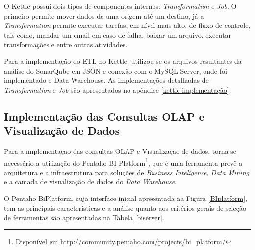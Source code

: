 O Kettle possui dois tipos de componentes internos: \textit{Transformation} e \textit{Job}. O primeiro permite mover dados de uma origem até um destino, já a \textit{Transformation} permite executar tarefas, em nível mais alto, de fluxo de controle, tais como, mandar um email em caso de falha, baixar um arquivo, executar transformações  e entre outras atividades.

Para a implementação do ETL no Kettle, utilizou-se os arquivos resultantes da análise do SonarQube em JSON e conexão com o MySQL Server, onde foi implementado o Data Warehouse. As implementações detalhadas de \textit{Transformation} e \textit{Job} são apresentados no apêndice \ref{kettle-implementação}.


\subsection{Implementação das Consultas OLAP e Visualização de Dados}

Para a implementação das consultas OLAP e Visualização de dados, torna-se necessário a utilização do Pentaho BI Platform\footnote{Disponível em \url{http://community.pentaho.com/projects/bi_platform/}}, que é uma ferramenta provê a arquitetura e a infraestrutura para soluções de \textit{Business Inteligence}, \textit{Data Mining} e a camada de visualização de dados do \textit{Data Warehouse}.


O Pentaho BiPlatform, cuja interface inicial apresentada na Figura \ref{BIplatform}, tem as principais características e a análise quanto aos critérios gerais de seleção de ferramentas são apresentadas na Tabela \ref{biserver}. 


